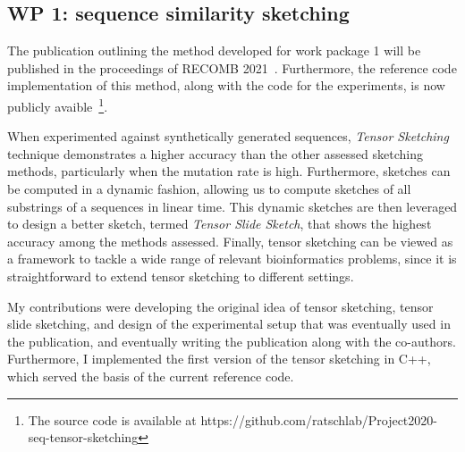 

\subsection{WP 1: sequence similarity sketching}
The publication outlining the method developed for work package 1 will be published in the proceedings of RECOMB 2021~\cite{joudaki2020fast}. Furthermore, the reference code implementation of this method, along with the code for the experiments, is now publicly avaible~\footnote{The source code is available at https://github.com/ratschlab/Project2020-seq-tensor-sketching}. 

When experimented against synthetically generated sequences, \emph{Tensor Sketching} technique demonstrates a higher accuracy than the other assessed sketching methods, particularly when the mutation rate is high. Furthermore, sketches can be computed in a dynamic fashion, allowing us to compute sketches of all substrings of a sequences in linear time. This dynamic sketches are then leveraged to design a better sketch, termed \emph{Tensor Slide Sketch}, that shows the highest accuracy among the methods assessed. Finally, tensor sketching can be viewed as a framework to tackle a wide range of relevant bioinformatics problems, since it is straightforward to extend tensor sketching to different settings.

My contributions were developing the original idea of tensor sketching, tensor slide sketching, and design of the experimental setup that was eventually used in the publication, and eventually writing the publication along with the co-authors.  Furthermore, I implemented the first version of the tensor sketching in C++, which served the basis of the current reference code.

